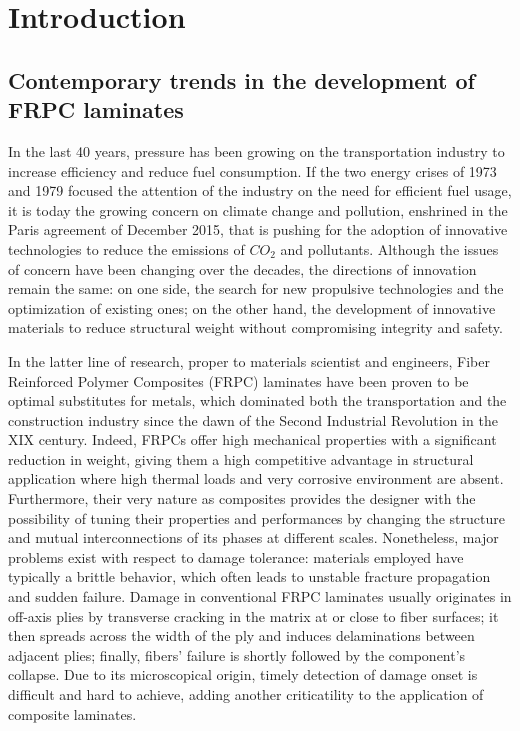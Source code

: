 \documentclass[a4paper]{jpconf}
\begin{document}

\section{Introduction}
\subsection{Contemporary trends in the development of FRPC laminates}
In the last 40 years, pressure has been growing on the transportation industry to increase efficiency and reduce fuel consumption. If the two energy crises of 1973 and 1979 focused the attention of the industry on the need for efficient fuel usage, it is today the growing concern on climate change and pollution, enshrined in the Paris agreement of December 2015, that is pushing for the adoption of innovative technologies to reduce the emissions of $CO_{2}$ and pollutants. Although the issues of concern have been changing over the decades, the directions of innovation remain the same: on one side, the search for new propulsive technologies and the optimization of existing ones; on the other hand, the development of innovative materials to reduce structural weight without compromising integrity and safety.\par
In the latter line of research, proper to materials scientist and engineers, Fiber Reinforced Polymer Composites (FRPC) laminates have been proven to be optimal substitutes for metals, which dominated both the transportation and the construction industry since the dawn of the Second Industrial Revolution in the XIX century. Indeed, FRPCs offer high mechanical properties with a significant reduction in weight, giving them a high competitive advantage in structural application where high thermal loads and very corrosive environment are absent. Furthermore, their very nature as composites provides the designer with the possibility of tuning their properties and performances by changing the structure and mutual interconnections of its phases at different scales. Nonetheless, major problems exist with respect to damage tolerance: materials employed have typically a brittle behavior, which often leads to unstable fracture propagation and sudden failure. Damage in conventional FRPC laminates usually originates in off-axis plies by transverse cracking in the matrix at or close to fiber surfaces; it then spreads across the width of the ply and induces delaminations between adjacent plies; finally, fibers' failure is shortly followed by the component's collapse. Due to its microscopical origin, timely detection of damage onset is difficult and hard to achieve, adding another criticatility to the application of composite laminates.
\end{document}
